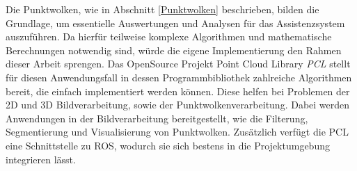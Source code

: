 Die Punktwolken, wie in Abschnitt \ref{Punktwolken} beschrieben, bilden die Grundlage, um essentielle Auswertungen und Analysen für das Assistenzsystem auszuführen. Da hierfür teilweise komplexe Algorithmen und mathematische Berechnungen notwendig sind, würde die eigene Implementierung den Rahmen dieser Arbeit sprengen. \newline
Das OpenSource Projekt Point Cloud Library \emph{PCL} stellt für diesen Anwendungsfall in dessen Programmbibliothek zahlreiche Algorithmen bereit, die einfach implementiert werden können. Diese helfen bei Problemen der 2D und 3D Bildverarbeitung, sowie der Punktwolkenverarbeitung.\cite{pclGeneral} %
Dabei werden Anwendungen in der Bildverarbeitung bereitgestellt, wie die Filterung, Segmentierung und Visualisierung von Punktwolken. \newline
Zusätzlich verfügt die PCL eine Schnittstelle zu ROS, wodurch sie sich bestens in die Projektumgebung integrieren lässt.